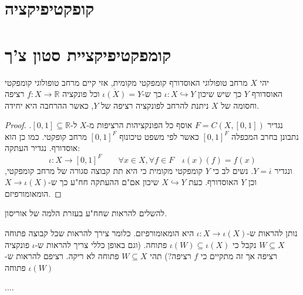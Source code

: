\documentclass{tstextbook}
\begin{document}
\section{קופקטיפיקציה}

\section{קומפקטיפיקציית סטון צ'ך}

\begin{theorem}
יהי \(X\) מרחב טופולוגי האוסדורף קומפקטי מקומית, אזי קיים מרחב טופולוגי קומפקטי האוסדורף \(Y\) כך שיש שיכון \(\iota:X\hookrightarrow Y\) כך ש-\(\overline{\iota(X)}=Y\) וכל פונקציה \(f:X\to \mathbb{R}\) רציפה וחסומה של \(X\) ניתנת להרחב לפונקציה רציפה של \(Y\), כאשר ההרחבה היא יחידה.

\end{theorem}
\begin{proof}
נגדיר \(F=C(X,[0,1])\) אוסף כל הפונקציהות הרציפות מ-\(X\) ל-\([0,1]\subseteq \mathbb{R}\). נתבונן בחרב המכפלה \([0,1]^{F}\) כאשר לפי משפט טיכונוף \([0,1]^{F}\) מרחב קופקטי. כמו כן הוא אוסדורף. נגדיר העתקה:
$$\iota :X\to[0,1]^{F}\qquad \forall x \in X, \forall f \in F\quad \iota(x)(f)=f(x)$$
ונגדיר \(Y=\overline{\iota}\). נשים לב כי \(Y\) קומפקטי מקומית כי היא תת קבוצה סגורה של מרחב קומפקטי,  וכן \(Y\) האוסדורף. כעת \(X\hookrightarrow Y\) שיכון אם"ם ההעתקה חח"ע כך ש-\(X\to \iota(X)\) הומאומורפיזם.

\end{proof}
להשלים להראות שחח"ע בעזרת הלמה של אוריסון.

נותן להראות ש-\(\iota:X\to \iota(X)\) היא הומאומורפיזם. כלומר צירך להראות שכל קבוצה פתוחה \(W\subseteq X\) נקבל כי \(\iota(W)\subseteq \iota(X)\) פתוחה. (וגם באופן כללי צריך להראות ש-\(\iota\) פונקציה רציפה אך זה מתקיים כי \(f\) רציפה?)
תהי \(W\subseteq X\) פתוחה לא ריקה. רציפם להראות ש-\(\iota(W)\) פתוחה

....
\end{document}
